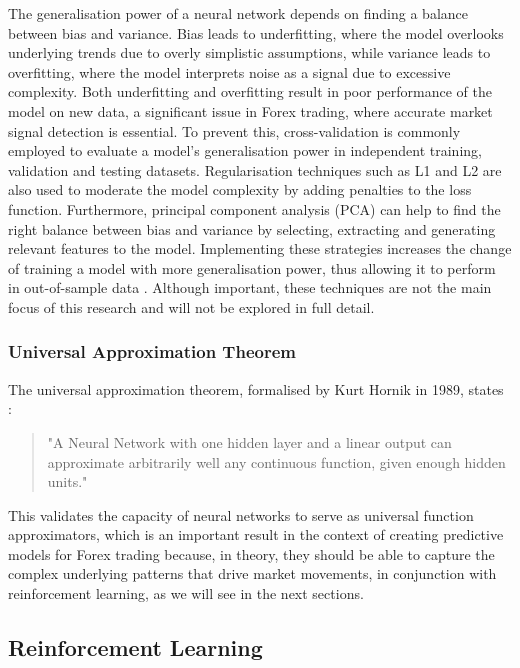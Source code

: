 The generalisation power of a neural network depends on finding a balance between bias and variance. Bias leads to underfitting, where the model overlooks underlying trends due to overly simplistic assumptions, while variance leads to overfitting, where the model interprets noise as a signal due to excessive complexity. Both underfitting and overfitting result in poor performance of the model on new data, a significant issue in Forex trading, where accurate market signal detection is essential. To prevent this, cross-validation is commonly employed to evaluate a model's generalisation power in independent training, validation and testing datasets. Regularisation techniques such as L1 and L2 are also used to moderate the model complexity by adding penalties to the loss function. Furthermore, principal component analysis (PCA) can help to find the right balance between bias and variance by selecting, extracting and generating relevant features to the model. Implementing these strategies increases the change of training a model with more generalisation power, thus allowing it to perform in out-of-sample data \cite{goodfellow_deep_2016}. Although important, these techniques are not the main focus of this research and will not be explored in full detail.

\subsubsection{Universal Approximation Theorem}

The universal approximation theorem, formalised by Kurt Hornik in 1989, states \cite{hornik_multilayer_1989}:

\begin{quote}
"A Neural Network with one hidden layer and a linear output can approximate arbitrarily well any continuous function, given enough hidden units."
\end{quote}

This validates the capacity of neural networks to serve as universal function approximators, which is an important result in the context of creating predictive models for Forex trading because, in theory, they should be able to capture the complex underlying patterns that drive market movements, in conjunction with reinforcement learning, as we will see in the next sections.

\subsection{Reinforcement Learning}

